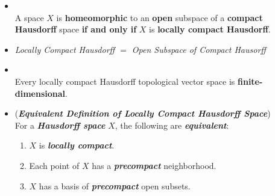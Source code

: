 \documentclass[11pt]{article}
\begin{document}
\begin{itemize}
\item \begin{corollary}  \citep{munkres2000topology} \\
A space $X$ is \textbf{homeomorphic} to an \textbf{open} subspace of a \textbf{compact Hausdorff} space \textbf{if and only if} $X$ is \textbf{locally compact Hausdorff}.
\end{corollary}

\item \begin{remark}
\emph{Locally Compact Hausdorff $=$ Open Subspace of Compact Hausorff}
 \end{remark}
 
 \item \begin{theorem} \citep{treves2016topological}\\
 Every locally compact Hausdorff topological vector space is \textbf{finite-dimensional}.
 \end{theorem}


\item \begin{remark} (\textbf{\emph{Equivalent Definition of Locally Compact Hausdorff Space}})\\
For a \textbf{\emph{Hausdorff space}} $X$,  the following are \textbf{\emph{equivalent}}:
\begin{enumerate}
\item $X$ is \textbf{\emph{locally compact}}.
\item Each point of $X$ has a \textbf{\emph{precompact}} neighborhood. 
\item $X$ has a basis of \textbf{\emph{precompact}} open subsets.
\end{enumerate}
\end{remark}
\end{itemize}
\end{document}
